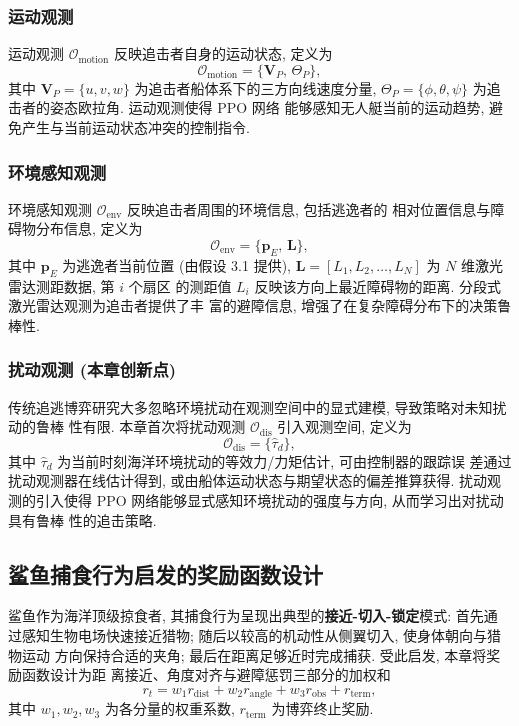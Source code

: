\subsubsection{运动观测}
运动观测 $\mathcal{O}_{\mathrm{motion}}$ 反映追击者自身的运动状态, 定义为
\begin{equation}
\mathcal{O}_{\mathrm{motion}} = \{\mathbf{V}_P,\, \Theta_P\},
\label{eq:obs_motion}
\end{equation}
其中 $\mathbf{V}_P = \{u, v, w\}$ 为追击者船体系下的三方向线速度分量,
$\Theta_P = \{\phi, \theta, \psi\}$ 为追击者的姿态欧拉角. 运动观测使得 PPO 网络
能够感知无人艇当前的运动趋势, 避免产生与当前运动状态冲突的控制指令.

\subsubsection{环境感知观测}
环境感知观测 $\mathcal{O}_{\mathrm{env}}$ 反映追击者周围的环境信息, 包括逃逸者的
相对位置信息与障碍物分布信息, 定义为
\begin{equation}
\mathcal{O}_{\mathrm{env}} = \{\mathbf{p}_E,\, \mathbf{L}\},
\label{eq:obs_env}
\end{equation}
其中 $\mathbf{p}_E$ 为逃逸者当前位置 (由假设 3.1 提供),
$\mathbf{L} = [L_1, L_2, \ldots, L_N]$ 为 $N$ 维激光雷达测距数据, 第 $i$ 个扇区
的测距值 $L_i$ 反映该方向上最近障碍物的距离. 分段式激光雷达观测为追击者提供了丰
富的避障信息, 增强了在复杂障碍分布下的决策鲁棒性.

\subsubsection{扰动观测 (本章创新点)}
传统追逃博弈研究大多忽略环境扰动在观测空间中的显式建模, 导致策略对未知扰动的鲁棒
性有限. 本章首次将扰动观测 $\mathcal{O}_{\mathrm{dis}}$ 引入观测空间, 定义为
\begin{equation}
\mathcal{O}_{\mathrm{dis}} = \{\hat{\tau}_d\},
\label{eq:obs_dis}
\end{equation}
其中 $\hat{\tau}_d$ 为当前时刻海洋环境扰动的等效力/力矩估计, 可由控制器的跟踪误
差通过扰动观测器在线估计得到, 或由船体运动状态与期望状态的偏差推算获得. 扰动观
测的引入使得 PPO 网络能够显式感知环境扰动的强度与方向, 从而学习出对扰动具有鲁棒
性的追击策略.

\subsection{鲨鱼捕食行为启发的奖励函数设计}
\label{subsec:pe_reward}
鲨鱼作为海洋顶级掠食者, 其捕食行为呈现出典型的\textbf{接近-切入-锁定}模式: 首先通
过感知生物电场快速接近猎物; 随后以较高的机动性从侧翼切入, 使身体朝向与猎物运动
方向保持合适的夹角; 最后在距离足够近时完成捕获. 受此启发, 本章将奖励函数设计为距
离接近、角度对齐与避障惩罚三部分的加权和
\begin{equation}
r_t = w_1 r_{\mathrm{dist}} + w_2 r_{\mathrm{angle}} + w_3 r_{\mathrm{obs}} + r_{\mathrm{term}},
\label{eq:pe_reward}
\end{equation}
其中 $w_1, w_2, w_3$ 为各分量的权重系数, $r_{\mathrm{term}}$ 为博弈终止奖励.

